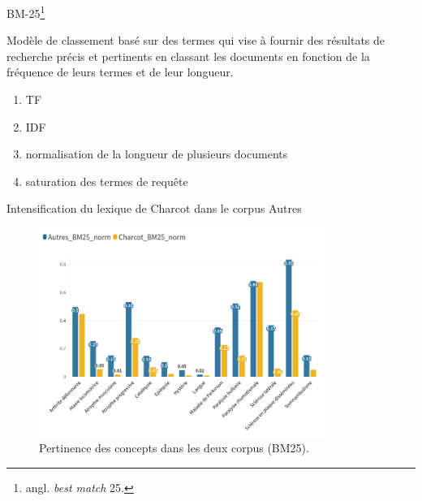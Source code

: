\begin{frame}{\textsc{BM-25}\footnote{angl. \textit{best match} 25.}}

\begin{block}{}
Modèle de classement basé sur des termes qui vise à fournir des résultats de recherche précis et pertinents en classant les documents en fonction de la fréquence de leurs termes et de leur longueur.
\end{block}

\begin{enumerate}
\item TF
\item IDF
\item normalisation de la longueur de plusieurs documents
\item saturation des termes de requête
\end{enumerate}
\medskip


\end{frame}

\begin{frame}{Intensification du lexique
de Charcot dans le corpus \og{}Autres\fg}
\begin{figure}[!h]
    \centering
\includegraphics[width=94mm,scale=0.5]{pic/Charcot_Autres_250523.png}
    \caption{Pertinence des concepts dans les deux corpus (BM25).}
    \label{fig:my_label}
\end{figure}
\end{frame}


